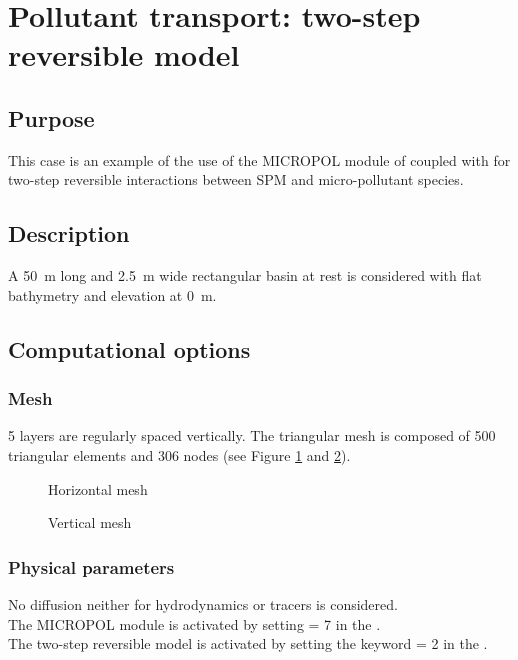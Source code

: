 \section{Pollutant transport: two-step reversible model}

\subsection{Purpose}

This case is an example of the use of the MICROPOL module of \waqtel
coupled with  for two-step reversible interactions between SPM and
micro-pollutant species.

\subsection{Description}

A 50~m long and 2.5~m wide rectangular basin at rest is considered
with flat bathymetry and elevation at 0~m.

\subsection{Computational options}

\subsubsection{Mesh}

5 layers are regularly spaced vertically.
The triangular mesh is composed of 500 triangular elements and
306 nodes (see Figure \ref{fig:waq3d_micropol:mesh_pol} and \ref{fig:waq3d_micropol:mesh_pol_sec}).

\begin{figure}[H]
 \centering
\caption{Horizontal mesh}
 \label{fig:waq3d_micropol:mesh_pol}
\end{figure}

\begin{figure}[H]
 \centering
\caption{Vertical mesh}
 \label{fig:waq3d_micropol:mesh_pol_sec}
\end{figure}

\subsubsection{Physical parameters}
No diffusion neither for hydrodynamics or tracers is considered.\\
The MICROPOL module is activated by setting  = 7
in the  .\\
The two-step reversible model is activated by setting the keyword  = 2 in the \waqtel {}.\\

